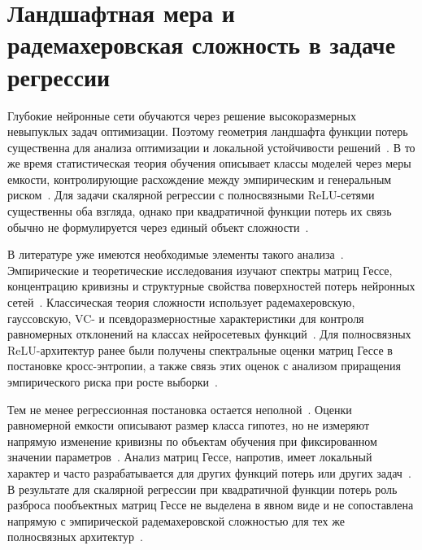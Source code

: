 \section{Ландшафтная мера и радемахеровская сложность в задаче регрессии}

Глубокие нейронные сети обучаются через решение высокоразмерных невыпуклых задач оптимизации. Поэтому геометрия ландшафта функции потерь существенна для анализа оптимизации и локальной устойчивости решений~\cite{fort2019emergent, pmlr-v97-ghorbani19b, sagun2018empiricalanalysishessianoverparametrized}.
В то же время статистическая теория обучения описывает классы моделей через меры емкости, контролирующие расхождение между эмпирическим и генеральным риском~\cite{bartlett2002rademacher, vapnik1998}.
Для задачи скалярной регрессии с полносвязными ReLU-сетями существенны оба взгляда, однако при квадратичной функции потерь их связь обычно не формулируется через единый объект сложности~\cite{bartlett2002rademacher, vapnik1998, grabovoi2024unraveling748584228}.

В литературе уже имеются необходимые элементы такого анализа~\cite{bartlett2002rademacher, pmlr-v97-ghorbani19b, grabovoi2024unraveling748584228}.
Эмпирические и теоретические исследования изучают спектры матриц Гессе, концентрацию кривизны и структурные свойства поверхностей потерь нейронных сетей~\cite{pmlr-v97-ghorbani19b, sagun2018empiricalanalysishessianoverparametrized, papyan2019spectrumdeepnethessiansscale, wu2022dissecting, pennington2017spectrum}.
Классическая теория сложности использует радемахеровскую, гауссовскую, VC- и псевдоразмерностные характеристики для контроля равномерных отклонений на классах нейросетевых функций~\cite{bartlett2002rademacher, vapnik1998, harvey2019jmlr}.
Для полносвязных ReLU-архитектур ранее были получены спектральные оценки матриц Гессе в постановке кросс-энтропии, а также связь этих оценок с анализом приращения эмпирического риска при росте выборки~\cite{grabovoi2024unraveling748584228}.

Тем не менее регрессионная постановка остается неполной~\cite{bartlett2002rademacher, vapnik1998, grabovoi2024unraveling748584228}.
Оценки равномерной емкости описывают размер класса гипотез, но не измеряют напрямую изменение кривизны по объектам обучения при фиксированном значении параметров~\cite{bartlett2002rademacher, vapnik1998}.
Анализ матриц Гессе, напротив, имеет локальный характер и часто разрабатывается для других функций потерь или других задач~\cite{grabovoi2024unraveling748584228, NEURIPS2018_5a4be1fa, lee2018wide}.
В результате для скалярной регрессии при квадратичной функции потерь роль разброса пообъектных матриц Гессе не выделена в явном виде и не сопоставлена напрямую с эмпирической радемахеровской сложностью для тех же полносвязных архитектур~\cite{bartlett2002rademacher, grabovoi2024unraveling748584228}.

